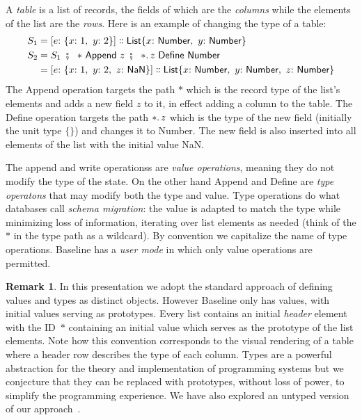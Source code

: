 \documentclass[english,submission]{programming}
\theoremstyle{definition}
\newtheorem*{remark}{Remark}
\newcommand{\mathbox}[1]{\colorbox{black!10}{$#1$}}
\DeclareMathOperator{\exec}{\ \fatsemi\ \ }
\newcommand{\is}{{:}\ }
\newcommand{\comma}{,\ }
\newcommand{\isa}{\dblcolon}
\begin{document}
A \textit{table} is a list of records, the fields of which are the \textit{columns} while the elements of the list are the \textit{rows}. Here is an example of changing the type of a table:
\begin{align*}
S_1 &= [e \is \{x \is 1 \comma  y \is 2\}] \isa \textsf{List} \{x \is \textsf{Number}\comma  y \is \textsf{Number}\}\\
S_2 &= S_1 \exec * \textsf{ Append } z \exec *\ldotp z \textsf{ Define Number}\\
 &= [e \is \{x \is 1\comma  y \is 2,\ z\is \textsf{NaN}\}] \isa \textsf{List} \{x \is \textsf{Number}\comma  y \is \textsf{Number}\comma z\is \textsf{Number}\}\\
\end{align*}
The \textsf{Append} operation targets the path \mathbox{*} which is the record type of the list's elements and adds a new field \mathbox{z} to it, in effect adding a column to the table. The \textsf{Define} operation targets the path \mathbox{*\ldotp z} which is the type of the new field (initially the unit type $\{\}$) and changes it to \textsf{Number}. The new field is also inserted into all elements of the list with the initial value \textsf{NaN}.

The \textsf{append} and \textsf{write} operationss are \textit{value operations}, meaning they do not modify the type of the state. On the other hand \textsf{Append} and \textsf{Define} are \textit{type operatons} that may modify both the type and value. Type operations do what databases call \textit{schema migration}: the value is adapted to match the type while minimizing loss of information, iterating over list elements as needed (think of the $*$ in the type path as a wildcard). By convention we capitalize the name of type operations. Baseline has a \textit{user mode} in which only value operations are permitted.

\begin{remark}
In this presentation we adopt the standard approach of defining values and types as distinct objects. However Baseline only has values, with initial values serving as prototypes. Every list contains an initial \textit{header} element with the ID~\mathbox{*} containing an initial value which serves as the prototype of the list elements. Note how this convention corresponds to the visual rendering of a table where a header row describes the type of each column. Types are a powerful abstraction for the theory and implementation of programming systems but we conjecture that they can be replaced with prototypes, without loss of power, to simplify the programming experience. We have also explored an untyped version of our approach~\cite{denicek}.
\end{remark}
\end{document}

